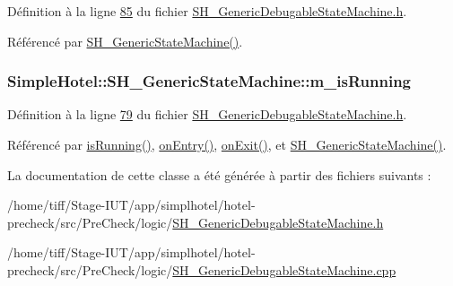 Définition à la ligne \hyperlink{SH__GenericDebugableStateMachine_8h_source_l00085}{85} du fichier \hyperlink{SH__GenericDebugableStateMachine_8h_source}{S\-H\-\_\-\-Generic\-Debugable\-State\-Machine.\-h}.



Référencé par \hyperlink{classSimpleHotel_1_1SH__GenericStateMachine_a0943c733abdbe70ea78f9e1f90a26154}{S\-H\-\_\-\-Generic\-State\-Machine()}.

\hypertarget{classSimpleHotel_1_1SH__GenericStateMachine_a703eee4728e3d7b457688500daf45595}{
\subsubsection[{m\-\_\-is\-Running}]{\setlength{\rightskip}{0pt plus 5cm}Simple\-Hotel\-::\-S\-H\-\_\-\-Generic\-State\-Machine\-::m\-\_\-is\-Running\hspace{0.3cm}{\ttfamily [private]}}}\label{classSimpleHotel_1_1SH__GenericStateMachine_a703eee4728e3d7b457688500daf45595}


Définition à la ligne \hyperlink{SH__GenericDebugableStateMachine_8h_source_l00079}{79} du fichier \hyperlink{SH__GenericDebugableStateMachine_8h_source}{S\-H\-\_\-\-Generic\-Debugable\-State\-Machine.\-h}.



Référencé par \hyperlink{classSimpleHotel_1_1SH__GenericStateMachine_a23d9e26143a6732fa5a8f540eb827e03}{is\-Running()}, \hyperlink{classSimpleHotel_1_1SH__GenericStateMachine_a42c47602883a70ef4965cff373cd5ab6}{on\-Entry()}, \hyperlink{classSimpleHotel_1_1SH__GenericStateMachine_adecc9814338e400f9fce1cc637f1e081}{on\-Exit()}, et \hyperlink{classSimpleHotel_1_1SH__GenericStateMachine_a0943c733abdbe70ea78f9e1f90a26154}{S\-H\-\_\-\-Generic\-State\-Machine()}.



La documentation de cette classe a été générée à partir des fichiers suivants \-:\begin{DoxyCompactItemize}
\item 
/home/tiff/\-Stage-\/\-I\-U\-T/app/simplhotel/hotel-\/precheck/src/\-Pre\-Check/logic/\hyperlink{SH__GenericDebugableStateMachine_8h}{S\-H\-\_\-\-Generic\-Debugable\-State\-Machine.\-h}\item 
/home/tiff/\-Stage-\/\-I\-U\-T/app/simplhotel/hotel-\/precheck/src/\-Pre\-Check/logic/\hyperlink{SH__GenericDebugableStateMachine_8cpp}{S\-H\-\_\-\-Generic\-Debugable\-State\-Machine.\-cpp}\end{DoxyCompactItemize}
